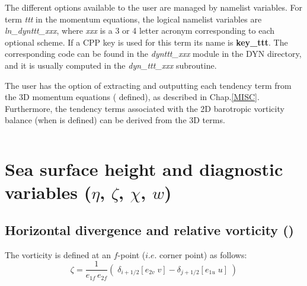 \documentclass[NEMO_book]{subfiles}
\begin{document}
The different options available to the user are managed by namelist variables. 
For term \textit{ttt} in the momentum equations, the logical namelist variables are \textit{ln\_dynttt\_xxx}, 
where \textit{xxx} is a 3 or 4 letter acronym corresponding to each optional scheme. 
If a CPP key is used for this term its name is \textbf{key\_ttt}. The corresponding 
code can be found in the \textit{dynttt\_xxx} module in the DYN directory, and it is 
usually computed in the \textit{dyn\_ttt\_xxx} subroutine.

The user has the option of extracting and outputting each tendency term from the
3D momentum equations ( defined), as described in 
Chap.\ref{MISC}.  Furthermore, the tendency terms associated with the 2D 
barotropic vorticity balance (when  is defined) can be derived from the 
3D terms.

$\ $\newline    %

\section{Sea surface height and diagnostic variables ($\eta$, $\zeta$, $\chi$, $w$)}
\label{DYN_divcur_wzv}

\subsection   [Horizontal divergence and relative vorticity (\textit{divcur})]
			{Horizontal divergence and relative vorticity ()}
\label{DYN_divcur}

The vorticity is defined at an $f$-point ($i.e.$ corner point) as follows:
\begin{equation} \label{Eq_divcur_cur}
\zeta =\frac{1}{e_{1f}\,e_{2f} }\left( {\;\delta _{i+1/2} \left[ {e_{2v}\;v} \right]
						        -\delta _{j+1/2} \left[ {e_{1u}\;u} \right]\;} \right)
\end{equation} 
\end{document}
